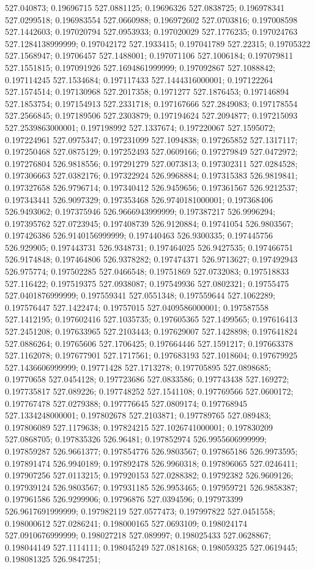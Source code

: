 527.040873; 0.19696715 527.0881125; 0.19696326 527.0838725; 0.196978341 527.0299518; 0.196983554 527.0660988; 0.196972602 527.0703816; 0.197008598 527.1442603; 0.197020794 527.0953933; 0.197020029 527.1776235; 0.197024763 527.1284138999999; 0.197042172 527.1933415; 0.197041789 527.22315; 0.19705322 527.1568947; 0.19706457 527.1488001; 0.197071106 527.1006184; 0.197079811 527.1551815; 0.197091926 527.1694861999999; 0.197092867 527.1088842; 0.197114245 527.1534684; 0.197117433 527.1444316000001; 0.197122264 527.1574514; 0.197130968 527.2017358; 0.1971277 527.1876453; 0.197146894 527.1853754; 0.197154913 527.2331718; 0.197167666 527.2849083; 0.197178554 527.2566845; 0.197189506 527.2303879; 0.197194624 527.2094877; 0.197215093 527.2539863000001; 0.197198992 527.1337674; 0.197220067 527.1595072; 0.197224961 527.0975347; 0.197231099 527.1094838; 0.197265852 527.1317117; 0.197250468 527.0875129; 0.197252493 527.0609166; 0.197279849 527.0472972; 0.197276804 526.9818556; 0.197291279 527.0073813; 0.197302311 527.0284528; 0.197306663 527.0382176; 0.197322924 526.9968884; 0.197315383 526.9819841; 0.197327658 526.9796714; 0.197340412 526.9459656; 0.197361567 526.9212537; 0.197343441 526.9097329; 0.197353468 526.9740181000001; 0.197368406 526.9493062; 0.197375946 526.9666943999999; 0.197387217 526.9996294; 0.197395762 527.0723945; 0.197408739 526.9120884; 0.19741054 526.9803567; 0.197426386 526.9140156999999; 0.197440463 526.9300335; 0.197445756 526.929905; 0.197443731 526.9348731; 0.197464025 526.9427535; 0.197466751 526.9174848; 0.197464806 526.9378282; 0.197474371 526.9713627; 0.197492943 526.975774; 0.197502285 527.0466548; 0.19751869 527.0732083; 0.197518833 527.116422; 0.197519375 527.0938087; 0.197549936 527.0802321; 0.19755475 527.0401876999999; 0.197559341 527.0551348; 0.197559644 527.1062289; 0.197576447 527.1422474; 0.19757015 527.0409586000001; 0.197587558 527.1412195; 0.197602416 527.1035735; 0.197605365 527.1499565; 0.197616413 527.2451208; 0.197633965 527.2103443; 0.197629007 527.1428898; 0.197641824 527.0886264; 0.19765606 527.1706425; 0.197664446 527.1591217; 0.197663378 527.1162078; 0.197677901 527.1717561; 0.197683193 527.1018604; 0.197679925 527.1436606999999; 0.19771428 527.1713278; 0.197705895 527.0898685; 0.19770658 527.0454128; 0.197723686 527.0833586; 0.197743438 527.169272; 0.197735817 527.089226; 0.197748252 527.1541108; 0.197769566 527.0600172; 0.197767478 527.0279388; 0.197776645 527.0809174; 0.197768945 527.1334248000001; 0.197802678 527.2103871; 0.197789765 527.089483; 0.197806089 527.1179638; 0.197824215 527.1026741000001; 0.197830209 527.0868705; 0.197835326 526.96481; 0.197852974 526.9955606999999; 0.197859287 526.9661377; 0.197854776 526.9803567; 0.197865186 526.9973595; 0.197891474 526.9940189; 0.197892478 526.9960318; 0.197896065 527.0246411; 0.197907256 527.0113215; 0.197920153 527.0288382; 0.19792382 526.9609126; 0.197939124 526.9803567; 0.197931185 526.9953465; 0.197959721 526.9858387; 0.197961586 526.9299906; 0.19796876 527.0394596; 0.197973399 526.9617691999999; 0.197982119 527.0577473; 0.197997822 527.0451558; 0.198000612 527.0286241; 0.198000165 527.0693109; 0.198024174 527.0910676999999; 0.198027218 527.089997; 0.198025433 527.0628867; 0.198044149 527.1114111; 0.198045249 527.0818168; 0.198059325 527.0619445; 0.198081325 526.9847251; 